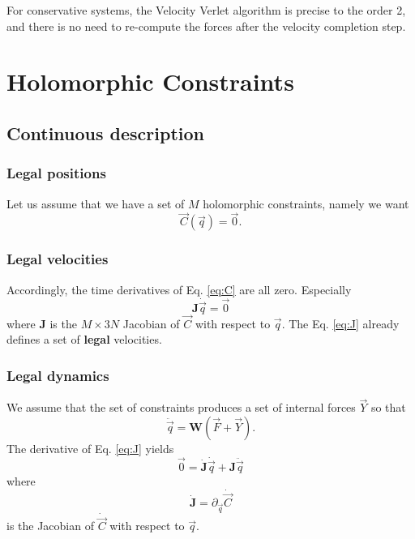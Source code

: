 \documentclass[aps,twocolumn]{revtex4}
\newcommand{\mymat}[1]{\boldsymbol{#1}}
\begin{document}
For conservative systems, the Velocity Verlet algorithm is precise to the order 2, and there is
no need to re-compute the forces after the velocity completion step.

\section{Holomorphic Constraints}
\subsection{Continuous description}
\subsubsection{Legal positions}

Let us assume that we have a set of $M$ holomorphic constraints, namely we want
\begin{equation}
	\label{eq:C}
	\vec{C}\left(\vec{q}\right) = \vec{0}.
\end{equation}

\subsubsection{Legal velocities}
Accordingly, the time derivatives of Eq. \eqref{eq:C} are all zero.
Especially
\begin{equation}
	\label{eq:J}
	\mymat{J}\dot{\vec{q}} = \vec{0}
\end{equation}
where $\mymat{J}$ is the $M\times 3N$ Jacobian of $\vec{C}$ with respect to $\vec{q}$.
The Eq. \eqref{eq:J} already defines a set of \textbf{legal} velocities.

\subsubsection{Legal dynamics}
We assume that the set of constraints produces a set of internal forces $\vec{Y}$ so that
\begin{equation}
	\ddot{\vec{q}} = \mymat{W} \left( \vec{F} + \vec{Y} \right).
\end{equation}
The derivative of Eq. \eqref{eq:J} yields
\begin{equation}
	\vec{0} = \dot{\mymat{J}}\dot{\vec{q}} + \mymat{J}\ddot{\vec{q}}
\end{equation}
where
\begin{equation}
	\dot{\mymat{J}} = \partial_{\vec{q}} \dot{\vec{C}}
\end{equation}
is the Jacobian of $\dot{\vec{C}}$ with respect to $\vec{q}$.
\end{document}
